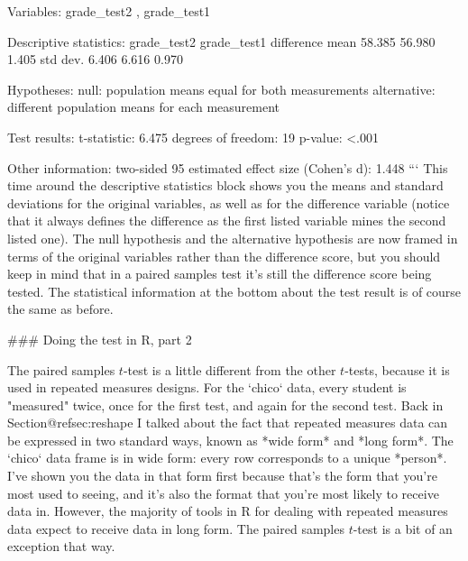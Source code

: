 Variables:  grade_test2 , grade_test1 

Descriptive statistics: 
            grade_test2 grade_test1 difference
   mean          58.385      56.980      1.405
   std dev.       6.406       6.616      0.970

Hypotheses: 
   null:        population means equal for both measurements
   alternative: different population means for each measurement

Test results: 
   t-statistic:  6.475 
   degrees of freedom:  19 
   p-value:  <.001 

Other information: 
   two-sided 95%
   estimated effect size (Cohen's d):  1.448 
```
This time around the descriptive statistics block shows you the means and standard deviations for the original variables, as well as for the difference variable (notice that it always defines the difference as the first listed variable mines the second listed one). The null hypothesis and the alternative hypothesis are now framed in terms of the original variables rather than the difference score, but you should keep in mind that in a paired samples test it's still the difference score being tested. The statistical information at the bottom about the test result is of course the same as before.


### Doing the test in R, part 2 

The paired samples $t$-test is a little different from the other $t$-tests, because it is used in repeated measures designs. For the `chico` data, every student is "measured" twice, once for the first test, and again for the second test. Back in Section@refsec:reshape I talked about the fact that repeated measures data can be expressed in two standard ways, known as *wide form* and *long form*. The `chico` data frame is in wide form: every row corresponds to a unique *person*. I've shown you the data in that form first because that's the form that you're most used to seeing, and it's also the format that you're most likely to receive data in. However, the majority of tools in R for dealing with repeated measures data expect to receive data in long form. The paired samples $t$-test is a bit of an exception that way. 
 
